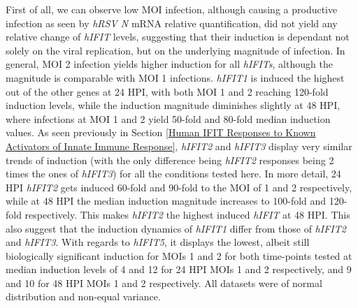 First of all, we can observe low MOI infection, although causing a productive infection as seen by \textit{hRSV N} mRNA relative quantification, did not yield any relative change of \textit{hIFIT} levels, suggesting that their induction is dependant not solely on the viral replication, but on the underlying magnitude of infection. In general, MOI 2 infection yields higher induction for all \textit{hIFITs}, although the magnitude is comparable with MOI 1 infections. \textit{hIFIT1} is induced the highest out of the other genes at 24 HPI, with both MOI 1 and 2 reaching 120-fold induction levels, while the induction magnitude diminishes slightly at 48 HPI, where infections at MOI 1 and 2 yield 50-fold and 80-fold median induction values. As seen previously in Section \ref{Human IFIT Responses to Known Activators of Innate Immune Response}, \textit{hIFIT2} and \textit{hIFIT3} display very similar trends of induction (with the only difference being \textit{hIFIT2} responses being 2 times the ones of \textit{hIFIT3}) for all the conditions tested here. In more detail, 24 HPI \textit{hIFIT2} gets induced 60-fold and 90-fold to the MOI of 1 and 2 respectively, while at 48 HPI the median induction magnitude increases to 100-fold and 120-fold respectively. This makes \textit{hIFIT2} the highest induced \textit{hIFIT} at 48 HPI. This also suggest that the induction dynamics of \textit{hIFIT1} differ from those of \textit{hIFIT2} and \textit{hIFIT3}. With regards to \textit{hIFIT5}, it displays the lowest, albeit still biologically significant induction for MOIs 1 and 2 for both time-points tested at median induction levels of 4 and 12 for 24 HPI MOIs 1 and 2 respectively, and 9 and 10 for 48 HPI MOIs 1 and 2 respectively. All datasets were of normal distribution and non-equal variance.


